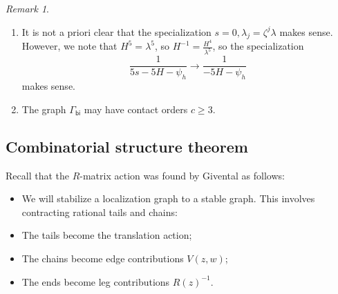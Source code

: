 \documentclass[10pt]{amsart}
\theoremstyle{definition}
\theoremstyle{remark}
\newtheorem{rmk}[thm]{Remark}
\theoremstyle{plain}
\theoremstyle{definition}
\theoremstyle{remark}
\newcommand{\ms}[1]{\mathsf{#1}}
\newcommand{\1}{\mathbf{1}}
\newcommand{\2}{\mathbf{2}}
\newcommand{\3}{\mathbf{3}}
\begin{document}
\begin{rmk}\leavevmode
    \begin{enumerate}
        \item It is not a priori clear that the specialization $s=0, \lambda_j = \zeta^j \lambda$ makes sense. However, we note that $H^5 = \lambda^5$, so $H^{-1} = \frac{H^4}{\lambda^5}$, so the specialization
            \[ \frac{1}{5s - 5H - \psi_h} \to \frac{1}{-5H - \psi_h} \]
            makes sense.
        \item The graph $\Gamma_{\ms{bi}}$ may have contact orders $c \geq 3$.
    \end{enumerate}
\end{rmk}

\subsection{Combinatorial structure theorem}%
\label{sub:Combinatorial structure theorem}

Recall that the $R$-matrix action was found by Givental as follows:
\begin{itemize}
    \item We will stabilize a localization graph to a stable graph. This involves contracting rational tails and chains:
    \item The tails become the translation action;
    \item The chains become edge contributions $V(z,w)$;
    \item The ends become leg contributions $R(z)^{-1}$.
\end{itemize}
\end{document}
